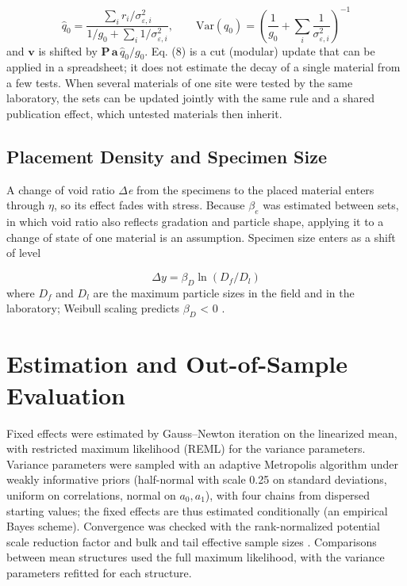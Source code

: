 \documentclass[Journal,letterpaper]{ascelike-new}
\begin{document}
\begin{equation}
\hat q_0=\frac{\sum_i r_i/\sigma_{\varepsilon,i}^2}{1/g_0+\sum_i 1/\sigma_{\varepsilon,i}^2},\qquad \mathrm{Var}(q_0)=\left(\frac{1}{g_0}+\sum_i\frac{1}{\sigma_{\varepsilon,i}^2}\right)^{-1}
\end{equation}
\noindent and $\mathbf{v}$ is shifted by $\mathbf{P}\,\mathbf{a}\,\hat q_0/g_0$. Eq. (8) is a cut (modular) update that can be applied in a spreadsheet; it does not estimate the decay of a single material from a few tests. When several materials of one site were tested by the same laboratory, the sets can be updated jointly with the same rule and a shared publication effect, which untested materials then inherit.

\subsection{Placement Density and Specimen Size}
A change of void ratio $\Delta$\textit{e} from the specimens to the placed material enters through $\eta$, so its effect fades with stress. Because $\beta_e$ was estimated between sets, in which void ratio also reflects gradation and particle shape, applying it to a change of state of one material is an assumption. Specimen size enters as a shift of level

\begin{equation}
\Delta y=\beta_D\ln\left(D_f/D_l\right)
\end{equation}
\noindent where $D_f$ and $D_l$ are the maximum particle sizes in the field and in the laboratory; Weibull scaling predicts $\beta_D$ < 0 \cite{frossard2012,ovalle2014,alonso2012}.

\section{Estimation and Out-of-Sample Evaluation}
Fixed effects were estimated by Gauss--Newton iteration on the linearized mean, with restricted maximum likelihood (REML) for the variance parameters. Variance parameters were sampled with an adaptive Metropolis algorithm under weakly informative priors (half-normal with scale 0.25 on standard deviations, uniform on correlations, normal on $a_0, a_1$), with four chains from dispersed starting values; the fixed effects are thus estimated conditionally (an empirical Bayes scheme). Convergence was checked with the rank-normalized potential scale reduction factor and bulk and tail effective sample sizes \cite{vehtari2021}. Comparisons between mean structures used the full maximum likelihood, with the variance parameters refitted for each structure.
\end{document}

